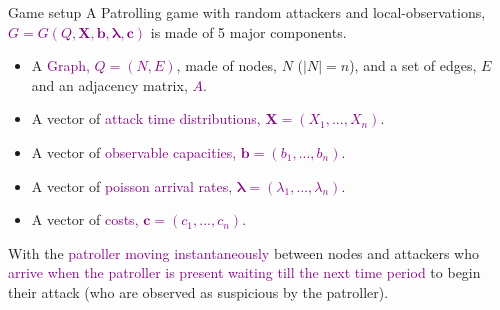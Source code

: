 \documentclass[10pt]{beamer}
\begin{document}
\begin{frame}{Game setup}
A Patrolling game with random attackers and local-observations, \textcolor{purple}{$G=G(Q,\bm{X},\bm{b},\bm{\lambda},\bm{c})$} is made of 5 major components.
\begin{itemize}
\item A \textcolor{purple}{Graph, $Q=(N,E)$}, made of nodes, $N$ ($|N|=n$), and a set of edges, $E$ and an adjacency matrix, \textcolor{purple}{$A$}.
\item A vector of \textcolor{purple}{attack time distributions, $\bm{X}=(X_{1},...,X_{n})$}.
\item A vector of \textcolor{purple}{observable capacities, $\bm{b}=(b_{1},...,b_{n})$}.
\item A vector of \textcolor{purple}{poisson arrival rates, $\bm{\lambda}=(\lambda_{1},...,\lambda_{n})$}.
\item A vector of \textcolor{purple}{costs, $\bm{c}=(c_{1},...,c_{n})$}.
\end{itemize}

\pause

With the \textcolor{purple}{patroller moving instantaneously} between nodes and attackers who \textcolor{purple}{arrive when the patroller is present waiting till the next time period} to begin their attack (who are observed as suspicious by the patroller).
\end{frame}
\end{document}
